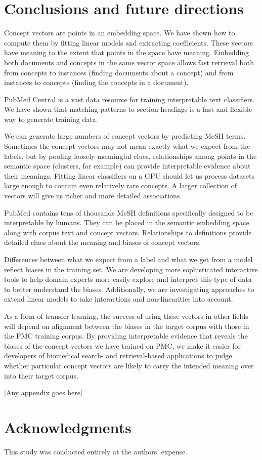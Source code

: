 \documentclass[letterpaper]{article} %
\begin{document}
\section{Conclusions and future directions}

Concept vectors are points in an embedding space. 
We have shown how to compute them by fitting linear models and extracting coefficients.
These vectors have meaning to the extent that points in the space have meaning.
Embedding both documents and concepts in the same vector space allows fast retrieval both from concepts to instances (finding documents about a concept) and from instances to concepts (finding the concepts in a document).

PubMed Central is a vast data resource for training interpretable text classifiers.
We have shown that matching patterns to section headings is a fast and flexible way to generate training data.

We can generate large numbers of concept vectors by predicting MeSH terms.
Sometimes the concept vectors may not mean exactly what we expect from the labels, but by pooling loosely meaningful clues, relationships among points in the semantic space (clusters, for example) can provide interpretable evidence about their meanings.
Fitting linear classifiers on a GPU should let us process datasets large enough to contain even relatively rare concepts.
A larger collection of vectors will give us richer and more detailed associations.

PubMed contains tens of thousands MeSH definitions specifically designed to be interpretable by humans.
They can be placed in the semantic embedding space along with corpus text and concept vectors.
Relationships to definitions provide detailed clues about the meaning and biases of concept vectors.

Differences between what we expect from a label and what we get from a model reflect biases in the training set.
We are developing more sophisticated interactive tools to help domain experts more easily explore and interpret this type of data to better understand the biases. Additionally, we are investigating approaches to extend linear models to take interactions and non-linearities into account.

As a form of transfer learning, the success of using these vectors in other fields will depend on alignment between the biases in the target corpus with those in the PMC training corpus.
By providing interpretable evidence that reveals the biases of the concept vectors we have trained on PMC, we make it easier for developers of biomedical search- and retrieval-based applications to judge whether particular concept vectors are likely to carry the intended meaning over into their target corpus.


\appendix

[Any appendix goes here]

\section{Acknowledgments}
This study was conducted entirely at the authors' expense.


\end{document}
